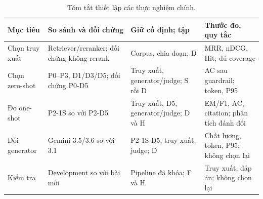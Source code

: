 \begin{table}[!htbp]\centering\small
\caption{Tóm tắt thiết lập các thực nghiệm chính.}\label{tab:experiment-map}
\begin{tabularx}{\linewidth}{@{}P{1.45cm}Y Y Y@{}}\toprule
\textbf{Mục tiêu} & \textbf{So sánh và đối chứng} & \textbf{Giữ cố định; tập} & \textbf{Thước đo, quy tắc}\\\midrule
Chọn truy xuất & Retriever/reranker; đối chứng không rerank & Corpus, chia đoạn; D & MRR, nDCG, Hit; đủ coverage \\
Chọn zero-shot & P0--P3, D1/D3/D5; đối chứng P0-D5 & Truy xuất, generator/judge; S rồi D & AC sau guardrail; token, P95 \\
Đo one-shot & P2-1S so với P2-D5 & Truy xuất, D5, generator/judge; D và H & EM/F1, AC, citation; phân tích đánh đổi \\
Đổi generator & Gemini 3.5/3.6 so với 3.1 & P2-1S-D5, truy xuất, judge; D & Chất lượng, token, P95; không chọn lại \\
Kiểm tra & Development so với bài mới & Pipeline đã khóa; F và H & Truy xuất, đáp án; không chọn lại \\\bottomrule
\end{tabularx}\end{table}
